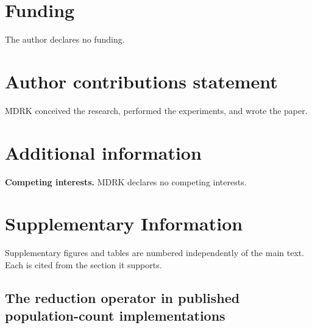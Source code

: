 \documentclass[fleqn,10pt]{wlscirep}
\begin{document}


\section*{Funding}
The author declares no funding.

\section*{Author contributions statement}
MDRK conceived the research, performed the experiments, and wrote the paper.

\section*{Additional information}
\noindent\textbf{Competing interests.} MDRK declares no competing interests.

\clearpage
\section*{Supplementary Information}

Supplementary figures and tables are numbered independently of the main text.
Each is cited from the section it supports.

\setcounter{figure}{0}
\renewcommand{\thefigure}{S\arabic{figure}}
\captionsetup[figure]{name=Supplementary Figure}
\setcounter{table}{0}
\renewcommand{\thetable}{S\arabic{table}}
\captionsetup[table]{name=Supplementary Table}

\subsection*{The reduction operator in published population-count implementations}
\end{document}
